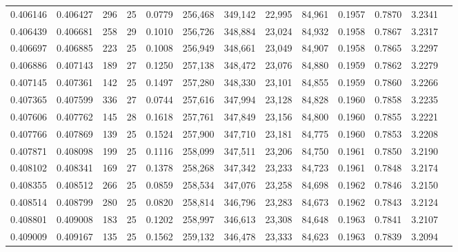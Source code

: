 \begin{tabular}{rrrrrrrrrrrrr}
0.406146 & 0.406427 &   296 &  25 &                                     0.0779 & 256,468 & 349,142 &  22,995 &  84,961 & 0.1957 & 0.7870 & 3.2341 \\
0.406439 & 0.406681 &   258 &  29 &                                     0.1010 & 256,726 & 348,884 &  23,024 &  84,932 & 0.1958 & 0.7867 & 3.2317 \\
0.406697 & 0.406885 &   223 &  25 &                                     0.1008 & 256,949 & 348,661 &  23,049 &  84,907 & 0.1958 & 0.7865 & 3.2297 \\
0.406886 & 0.407143 &   189 &  27 &                                     0.1250 & 257,138 & 348,472 &  23,076 &  84,880 & 0.1959 & 0.7862 & 3.2279 \\
0.407145 & 0.407361 &   142 &  25 &                                     0.1497 & 257,280 & 348,330 &  23,101 &  84,855 & 0.1959 & 0.7860 & 3.2266 \\
0.407365 & 0.407599 &   336 &  27 &                                     0.0744 & 257,616 & 347,994 &  23,128 &  84,828 & 0.1960 & 0.7858 & 3.2235 \\
0.407606 & 0.407762 &   145 &  28 &                                     0.1618 & 257,761 & 347,849 &  23,156 &  84,800 & 0.1960 & 0.7855 & 3.2221 \\
0.407766 & 0.407869 &   139 &  25 &                                     0.1524 & 257,900 & 347,710 &  23,181 &  84,775 & 0.1960 & 0.7853 & 3.2208 \\
0.407871 & 0.408098 &   199 &  25 &                                     0.1116 & 258,099 & 347,511 &  23,206 &  84,750 & 0.1961 & 0.7850 & 3.2190 \\
0.408102 & 0.408341 &   169 &  27 &                                     0.1378 & 258,268 & 347,342 &  23,233 &  84,723 & 0.1961 & 0.7848 & 3.2174 \\
0.408355 & 0.408512 &   266 &  25 &                                     0.0859 & 258,534 & 347,076 &  23,258 &  84,698 & 0.1962 & 0.7846 & 3.2150 \\
0.408514 & 0.408799 &   280 &  25 &                                     0.0820 & 258,814 & 346,796 &  23,283 &  84,673 & 0.1962 & 0.7843 & 3.2124 \\
0.408801 & 0.409008 &   183 &  25 &                                     0.1202 & 258,997 & 346,613 &  23,308 &  84,648 & 0.1963 & 0.7841 & 3.2107 \\
0.409009 & 0.409167 &   135 &  25 &                                     0.1562 & 259,132 & 346,478 &  23,333 &  84,623 & 0.1963 & 0.7839 & 3.2094 \\

\end{tabular}
